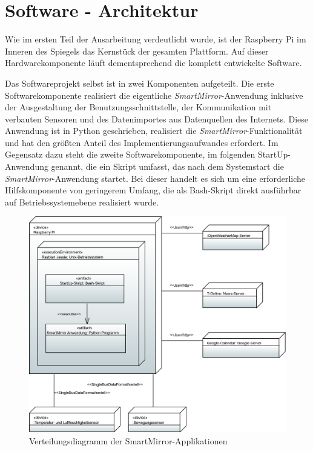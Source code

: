 \section{Software - Architektur}
\label{sec:softwarearchitektur}
Wie im ersten Teil der Ausarbeitung verdeutlicht wurde, ist der Raspberry Pi im Inneren des Spiegels das Kernstück der gesamten Plattform. Auf dieser Hardwarekomponente läuft dementsprechend die komplett entwickelte Software. 

Das Softwareprojekt selbst ist in zwei Komponenten aufgeteilt. Die erste Softwarekomponente realisiert die eigentliche \textit{SmartMirror}-Anwendung inklusive der Ausgestaltung der Benutzungsschnittstelle, der Kommunikation mit verbauten Sensoren und des Datenimportes aus Datenquellen des Internets. Diese Anwendung ist in Python geschrieben, realisiert die \textit{SmartMirror}-Funktionalität und hat den größten Anteil des Implementierungsaufwandes erfordert. Im Gegensatz dazu steht die zweite Softwarekomponente, im folgenden StartUp-Anwendung genannt, die ein Skript umfasst, das nach dem Systemstart die \textit{SmartMirror}-Anwendung startet. Bei dieser handelt es sich um eine erforderliche Hilfskomponente von geringerem Umfang, die als Bash-Skript direkt ausführbar auf Betriebssystemebene realisiert wurde.  

\begin{figure}
	\centering
	\includegraphics[width=0.8\linewidth]{bilder/DeploymentDiagram}
	\caption[Verteilungsdiagramm der SmartMirror-Applikationen]{Verteilungsdiagramm der SmartMirror-Applikationen}
	\label{fig:verteilungsdiagramm}
\end{figure}

